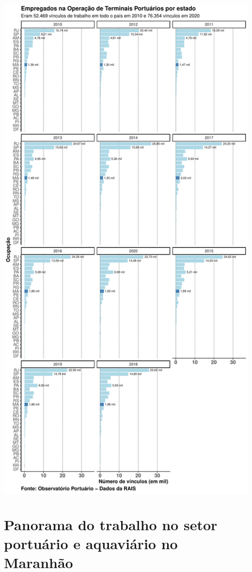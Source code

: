 \documentclass[
]{article}
\begin{document}
\includegraphics{mercado_trabalho_files/figure-latex/g_operacao_uf-1.pdf}

\hypertarget{panorama-do-trabalho-no-setor-portuuxe1rio-e-aquaviuxe1rio-no-maranhuxe3o}{%
\section{Panorama do trabalho no setor portuário e aquaviário no
Maranhão}\label{panorama-do-trabalho-no-setor-portuuxe1rio-e-aquaviuxe1rio-no-maranhuxe3o}}
\end{document}

